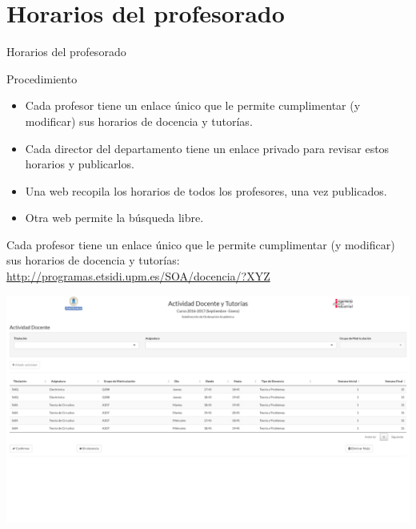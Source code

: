 \documentclass[spanish, xcolor={usenames,svgnames,dvipsnames}]{beamer}
\begin{document}
\section{Horarios del profesorado}
\label{sec:orgd7f5726}
\begin{frame}[label={sec:orgaa7e1fe}]{Horarios del profesorado}
\begin{block}{Procedimiento}
\begin{itemize}
\item Cada profesor tiene un enlace único que le permite cumplimentar (y modificar) sus horarios de docencia y tutorías.
\item Cada director del departamento tiene un enlace privado para revisar estos horarios y publicarlos.
\item Una web recopila los horarios de todos los profesores, una vez publicados.
\item Otra web permite la búsqueda libre.
\end{itemize}
\end{block}
\end{frame}

\begin{frame}[label={sec:org8c1140a}]{}
Cada profesor tiene un enlace único que le permite cumplimentar (y modificar) sus horarios de docencia y tutorías: \url{http://programas.etsidi.upm.es/SOA/docencia/?XYZ}

\begin{center}
\includegraphics[width=.9\linewidth]{images/formulario-docencia.png}
\end{center}
\end{frame}
\end{document}
